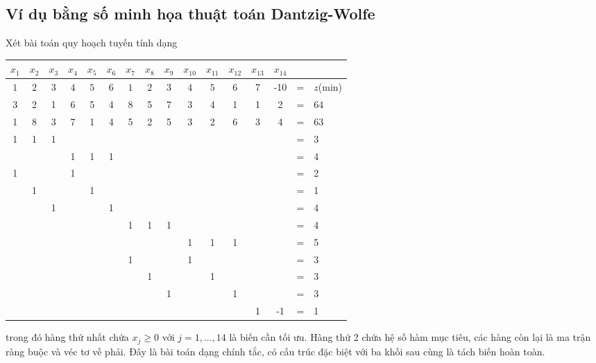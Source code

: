 \subsection{Ví dụ bằng số minh họa thuật toán Dantzig-Wolfe}
Xét bài toán quy hoạch tuyến tính dạng
\begin{center}
\begin{tabular}{|c c c c c c c c c c c c c c c l|}
\hline $x_1$ &$x_2$ &$x_3$ &$x_4$ &$x_5$ &$x_6$ &$x_7$ &$x_8$ &$x_9$ &$x_{10}$ &$x_{11}$ &$x_{12}$ &$x_{13}$ &$x_{14}$ & &\\
\hline $1$ &$2$ &$3$ &$4$ &$5$ &$6$ &$1$ &$2$ &$3$ &$4$ &$5$ &$6$ & 7 & -10 & = & $z$(min)\\
\hline 3 & 2 &1 & 6 &5 &4 &8 &5 &7 &3 &4 &1 & 1 & 2 & = & 64\\
1 & 8 &3 & 7 &1 &4 &5 &2 &5 &3 &2 &6 & 3 & 4 & = & 63\\
\hline 1 & 1 &1 & & & & & & & & & & & & = & 3\\
& & & 1 & 1 & 1 & & & & & & & & & = & 4\\
1 & & & 1 & & & & & & & & & & & = & 2\\
& 1 & & & 1 & & & & & & & & & & = & 1\\
& & 1 & & & 1 & & & & & & & & & = & 4\\
\hline & & & & & & 1 & 1 & 1 & & & & & & = & 4\\
& & & & & & & & & 1 & 1 & 1 & & & = & 5\\
& & & & & & 1 & & & 1 & & & & & = & 3\\
& & & & & & & 1 & & & 1 & & & & = & 3\\
& & & & & & & & 1 & & & 1 & & & = & 3\\
\hline & & & & & & & & & & & & 1 & -1 & = & 1\\
\hline
\end{tabular}
\end{center}
trong đó hàng thứ nhất chứa $x_j\geq 0 $ với $j=1,\dots,14$ là biến cần tối ưu. Hàng thứ 2 chứa hệ số hàm mục tiêu, các hàng còn lại là ma trận ràng buộc và véc tơ vế phải. Đây là bài toán dạng chính tắc, có cấu trúc đặc biệt với ba khối sau cùng là tách biến hoàn toàn. 

